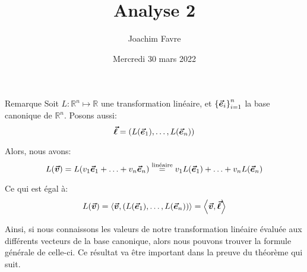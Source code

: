 \documentclass[a4paper]{article}
\title{Analyse 2}
\author{Joachim Favre}
\date{Mercredi 30 mars 2022}
\begin{document}
\maketitle


\begin{parag}{Remarque}
    Soit $L : \mathbb{R}^n \mapsto \mathbb{R}$ une transformation linéaire, et $\left\{\bvec{e}_i\right\}_{i=1}^n$ la base canonique de $\mathbb{R}^n$. Posons aussi: 
    \[\bvec{\ell} = \left(L\left(\bvec{e}_1\right), \ldots, L\left(\bvec{e}_n\right)\right)\]
    
    Alors, nous avons: 
    \[L\left(\bvec{v}\right) = L\left(v_1 \bvec{e}_1 + \ldots + v_n \bvec{e}_n\right) \over{=}{linéaire}  v_1 L\left(\bvec{e}_1\right) + \ldots + v_n L\left(\bvec{e}_n\right)\]

    Ce qui est égal à: 
    \[L\left(\bvec{v}\right) = \left<\bvec{v}, \left(L\left(\bvec{e}_1\right), \ldots, L\left(\bvec{e}_n\right)\right)\right> = \left<\bvec{v}, \bvec{\ell}\right>\]
    
    Ainsi, si nous connaissons les valeurs de notre transformation linéaire évaluée aux différents vecteurs de la base canonique, alors nous pouvons trouver la formule générale de celle-ci. Ce résultat va être important dans la preuve du théorème qui suit.
\end{parag}
\end{document}
